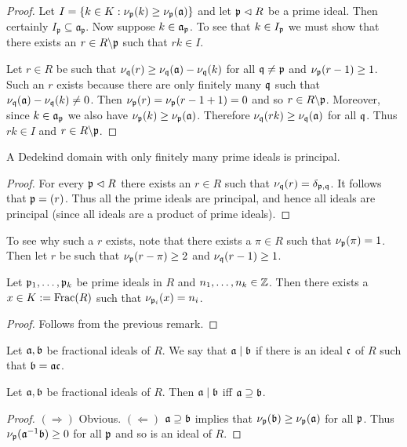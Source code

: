 \documentclass{memoir}
\begin{document}
\begin{proof}
    Let $I = \lbrace k\in K:\nu_{\mathfrak p}(k) \ge \nu_{\mathfrak p}(\mathfrak a)\rbrace$ and let $\mathfrak p\vartriangleleft R$ be a prime ideal.
    Then certainly $I_{\mathfrak p} \subseteq \mathfrak a_{\mathfrak p}$.
    Now suppose $k\in \mathfrak{a}_{\mathfrak{p}}$.
    To see that $k\in I_{\mathfrak{p}}$ we must show that there exists an $r\in R\backslash \mathfrak{p}$ such that $rk\in I$.

    Let $r\in R$ be such that $\nu_{\mathfrak{q}}(r) \ge \nu_{\mathfrak{q}}(\mathfrak{a}) - \nu_{\mathfrak{q}}(k)$ for all $\mathfrak{q}\ne \mathfrak{p}$ and $\nu_{\mathfrak{p}}(r-1)\ge 1$.
    Such an $r$ exists because there are only finitely many $\mathfrak{q}$ such that $\nu_{\mathfrak{q}}(\mathfrak{a}) - \nu_{\mathfrak{q}}(k) \ne 0$.
    Then $\nu_{\mathfrak{p}}(r) = \nu_{\mathfrak{p}}(r-1+1) = 0$ and so $r\in R\backslash \mathfrak{p}$.
    Moreover, since $k\in \mathfrak{a}_{\mathfrak{p}}$ we also have $\nu_{\mathfrak{p}}(k)\ge \nu_{\mathfrak{p}}(\mathfrak{a})$.
    Therefore $\nu_{\mathfrak{q}}(rk)\ge \nu_{\mathfrak{q}}(\mathfrak{a})$ for all $\mathfrak{q}$.
    Thus $rk\in I$ and $r\in R\backslash \mathfrak{p}$.
\end{proof}
\begin{corollary}
    A Dedekind domain with only finitely many prime ideals is principal.
\end{corollary}
\begin{proof}
    For every $\mathfrak{p}\vartriangleleft R$ there exists an $r\in R$ such that $\nu_{\mathfrak{q}}(r) = \delta_{\mathfrak{p},\mathfrak{q}}$.
    It follows that $\mathfrak{p} = (r)$.
    Thus all the prime ideals are principal, and hence all ideals are principal (since all ideals are a product of prime ideals).
\end{proof}
\begin{remark}
    To see why such a $r$ exists, note that there exists a $\pi\in R$ such that $\nu_{\mathfrak{p}}(\pi) = 1$.
    Then let $r$ be such that $\nu_{\mathfrak{p}}(r-\pi)\ge 2$ and $\nu_{\mathfrak{q}}(r-1) \ge 1$.
\end{remark}
\begin{corollary}
    Let $\mathfrak{p}_1,\dots,\mathfrak{p}_k$ be prime ideals in $R$ and $n_1,\dots,n_k\in \mathbb{Z}$.
    Then there exists a $x\in K := \text{Frac}(R)$ such that $\nu_{\mathfrak{p}_i}(x) = n_i$.
\end{corollary}
\begin{proof}
    Follows from the previous remark.
\end{proof}
\begin{definition}
    Let $\mathfrak{a},\mathfrak{b}$ be fractional ideals of $R$. 
    We say that $\mathfrak{a}\mid \mathfrak{b}$ if there is an ideal $\mathfrak{c}$ of $R$ such that $\mathfrak{b} = \mathfrak{a}\mathfrak{c}$.
\end{definition}
\begin{corollary}
    Let $\mathfrak{a}, \mathfrak{b}$ be fractional ideals of $R$.
    Then $\mathfrak{a}\mid \mathfrak{b}$ iff $\mathfrak{a}\supseteq \mathfrak{b}$.
\end{corollary}
\begin{proof}
    $(\Rightarrow)$ Obvious.
    $(\Leftarrow)$ $\mathfrak{a}\supseteq \mathfrak{b}$ implies that $\nu_{\mathfrak{p}}(\mathfrak{b})\ge \nu_{\mathfrak{p}}(\mathfrak{a})$ for all $\mathfrak{p}$.
    Thus $\nu_{\mathfrak{p}}(\mathfrak{a}^{-1}\mathfrak{b})\ge 0$ for all $\mathfrak{p}$ and so is an ideal of $R$.
\end{proof}
\end{document}
